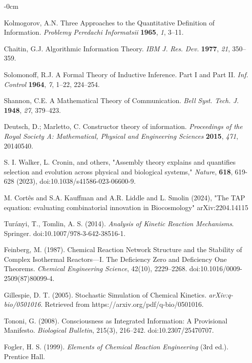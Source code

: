 \documentclass[entropy,article,submit,pdftex,moreauthors]{Definitions/mdpi}
\begin{document}
\begin{adjustwidth}{-\extralength}{0cm}
\begin{thebibliography}{999}
Kolmogorov, A.N. Three Approaches to the Quantitative Definition of Information. \textit{Problemy Peredachi Informatsii} \textbf{1965}, \textit{1}, 3–11.

Chaitin, G.J. Algorithmic Information Theory. \textit{IBM J. Res. Dev.} \textbf{1977}, \textit{21}, 350–359. 

Solomonoff, R.J. A Formal Theory of Inductive Inference. Part I and Part II. \textit{Inf. Control} \textbf{1964}, \textit{7}, 1–22, 224–254.

Shannon, C.E. A Mathematical Theory of Communication. \textit{Bell Syst. Tech. J.} \textbf{1948}, \textit{27}, 379–423.

Deutsch, D.; Marletto, C. Constructor theory of information. \textit{Proceedings of the Royal Society A: Mathematical, Physical and Engineering Sciences} \textbf{2015}, \textit{471}, 20140540. 

S. I. Walker, L. Cronin, and others,
"Assembly theory explains and quantifies selection and evolution across physical and biological systems," \textit{Nature}, \textbf{618}, 619-628 (2023), doi:10.1038/s41586-023-06600-9.

M. Cortês and S.A. Kauffman and A.R. Liddle and L. Smolin (2024), "The TAP equation: evaluating combinatorial innovation in Biocosmology" arXiv:2204.14115


Turányi, T., Tomlin, A. S. (2014). \textit{Analysis of Kinetic Reaction Mechanisms}. Springer. doi:10.1007/978-3-642-38516-1.

Feinberg, M. (1987). Chemical Reaction Network Structure and the Stability of Complex Isothermal Reactors—I. The Deficiency Zero and Deficiency One Theorems. \textit{Chemical Engineering Science}, 42(10), 2229–2268. doi:10.1016/0009-2509(87)80099-4.

Gillespie, D. T. (2005). Stochastic Simulation of Chemical Kinetics. \textit{arXiv:q-bio/0501016}. Retrieved from https://arxiv.org/pdf/q-bio/0501016.

Tononi, G. (2008). Consciousness as Integrated Information: A Provisional Manifesto. \textit{Biological Bulletin}, 215(3), 216–242. doi:10.2307/25470707.

Fogler, H. S. (1999). \textit{Elements of Chemical Reaction Engineering} (3rd ed.). Prentice Hall.


\end{thebibliography}
\end{adjustwidth}
\end{document}
